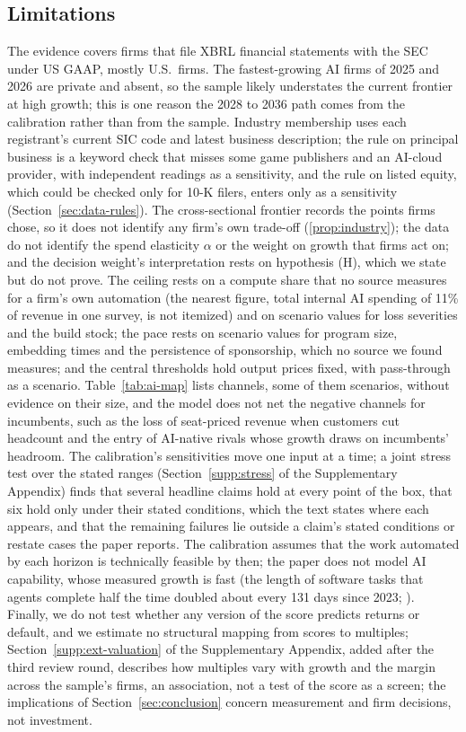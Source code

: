 \subsection{Limitations}\label{sec:discussion-limits}
The evidence covers firms that file XBRL financial statements with the SEC under US GAAP, mostly U.S.\ firms. The fastest-growing AI firms of 2025 and 2026 are private and absent, so the sample likely understates the current frontier at high growth; this is one reason the 2028 to 2036 path comes from the calibration rather than from the sample. Industry membership uses each registrant's current SIC code and latest business description; the rule on principal business is a keyword check that misses some game publishers and an AI-cloud provider, with independent readings as a sensitivity, and the rule on listed equity, which could be checked only for 10-K filers, enters only as a sensitivity (Section~\ref{sec:data-rules}). The cross-sectional frontier records the points firms chose, so it does not identify any firm's own trade-off (\autoref{prop:industry}); the data do not identify the spend elasticity $\alpha$ or the weight on growth that firms act on; and the decision weight's interpretation rests on hypothesis (H), which we state but do not prove. The ceiling rests on a compute share that no source measures for a firm's own automation (the nearest figure, total internal AI spending of 11\% of revenue in one survey, is not itemized) and on scenario values for loss severities and the build stock; the pace rests on scenario values for program size, embedding times and the persistence of sponsorship, which no source we found measures; and the central thresholds hold output prices fixed, with pass-through as a scenario. Table~\ref{tab:ai-map} lists channels, some of them scenarios, without evidence on their size, and the model does not net the negative channels for incumbents, such as the loss of seat-priced revenue when customers cut headcount and the entry of AI-native rivals whose growth draws on incumbents' headroom. The calibration's sensitivities move one input at a time; a joint stress test over the stated ranges (Section~\ref{supp:stress} of the Supplementary Appendix) finds that several headline claims hold at every point of the box, that six hold only under their stated conditions, which the text states where each appears, and that the remaining failures lie outside a claim's stated conditions or restate cases the paper reports. The calibration assumes that the work automated by each horizon is technically feasible by then; the paper does not model AI capability, whose measured growth is fast (the length of software tasks that agents complete half the time doubled about every 131 days since 2023; \citealp{metr2026th11}). Finally, we do not test whether any version of the score predicts returns or default, and we estimate no structural mapping from scores to multiples; Section~\ref{supp:ext-valuation} of the Supplementary Appendix, added after the third review round, describes how multiples vary with growth and the margin across the sample's firms, an association, not a test of the score as a screen; the implications of Section~\ref{sec:conclusion} concern measurement and firm decisions, not investment.
